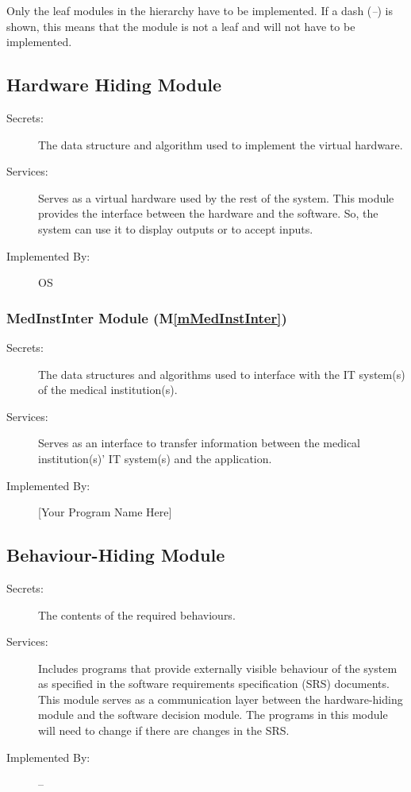 \documentclass[12pt, titlepage]{article}
\newcommand{\mref}[1]{M\ref{#1}}
\begin{document}
Only the leaf modules in the hierarchy have to be implemented. If a dash
(\emph{--}) is shown, this means that the module is not a leaf and will not have
to be implemented.

\subsection{Hardware Hiding Module}

\begin{description}
\item[Secrets:] The data structure and algorithm used to implement the virtual
  hardware.
\item[Services:] Serves as a virtual hardware used by the rest of the
  system. This module provides the interface between the hardware and the
  software. So, the system can use it to display outputs or to accept inputs.
\item[Implemented By:] OS
\end{description}

\subsubsection{MedInstInter Module (\mref{mMedInstInter})}

\begin{description}
  \item[Secrets:] The data structures and algorithms used to interface with
    the IT system(s) of the medical institution(s).
  \item[Services:] Serves as an interface to transfer information between the
    medical institution(s)' IT system(s) and the application.
  \item[Implemented By:] [Your Program Name Here]
\end{description}

\subsection{Behaviour-Hiding Module}

\begin{description}
\item[Secrets:]The contents of the required behaviours.
\item[Services:]Includes programs that provide externally visible behaviour of
  the system as specified in the software requirements specification (SRS)
  documents. This module serves as a communication layer between the
  hardware-hiding module and the software decision module. The programs in this
  module will need to change if there are changes in the SRS.
\item[Implemented By:] --
\end{description}
\end{document}

